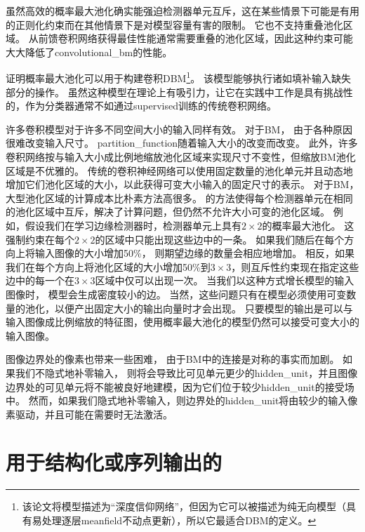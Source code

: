 虽然高效的概率最大池化确实能强迫检测器单元互斥，这在某些情景下可能是有用的正则化约束而在其他情景下是对模型容量有害的限制。
它也不支持重叠池化区域。
从前馈卷积网络获得最佳性能通常需要重叠的池化区域，因此这种约束可能大大降低了\gls{convolutional_bm}的性能。

\citet{HonglakL2009} 证明概率最大池化可以用于构建卷积\gls{DBM}\footnote{该论文将模型描述为``深度信仰网络''，但因为它可以被描述为纯无向模型（具有易处理逐层\gls{meanfield}不动点更新），所以它最适合\gls{DBM}的定义。}。
该模型能够执行诸如填补输入缺失部分的操作。
虽然这种模型在理论上有吸引力，让它在实践中工作是具有挑战性的，作为分类器通常不如通过\gls{supervised}训练的传统卷积网络。


许多卷积模型对于许多不同空间大小的输入同样有效。
对于\gls{BM}， 由于各种原因很难改变输入尺寸。
\gls{partition_function}随着输入大小的改变而改变。
此外，许多卷积网络按与输入大小成比例地缩放池化区域来实现尺寸不变性，但缩放\gls{BM}池化区域是不优雅的。
传统的卷积神经网络可以使用固定数量的池化单元并且动态地增加它们池化区域的大小，以此获得可变大小输入的固定尺寸的表示。
对于\gls{BM}，大型池化区域的计算成本比朴素方法高很多。
 \citet{HonglakL2009} 的方法使得每个检测器单元在相同的池化区域中互斥，解决了计算问题，但仍然不允许大小可变的池化区域。
例如，假设我们在学习边缘检测器时，检测器单元上具有$2 \times 2$的概率最大池化。
这强制约束在每个$2 \times 2$的区域中只能出现这些边中的一条。
如果我们随后在每个方向上将输入图像的大小增加50\%， 则期望边缘的数量会相应地增加。
相反，如果我们在每个方向上将池化区域的大小增加50\%到$3 \times 3 $，则互斥性约束现在指定这些边中的每一个在$3 \times3$区域中仅可以出现一次。
当我们以这种方式增长模型的输入图像时， 模型会生成密度较小的边。
当然，这些问题只有在模型必须使用可变数量的池化，以便产出固定大小的输出向量时才会出现。
只要模型的输出是可以与输入图像成比例缩放的特征图，使用概率最大池化的模型仍然可以接受可变大小的输入图像。

图像边界处的像素也带来一些困难， 由于\gls{BM}中的连接是对称的事实而加剧。
如果我们不隐式地补零输入， 则将会导致比可见单元更少的\gls{hidden_unit}，并且图像边界处的可见单元将不能被良好地建模，因为它们位于较少\gls{hidden_unit}的接受场中。
然而，如果我们隐式地补零输入，则边界处的\gls{hidden_unit}将由较少的输入像素驱动，并且可能在需要时无法激活。


\section{用于结构化或序列输出的}
\label{sec:boltzmann_machines_for_structured_or_sequential_outputs}

